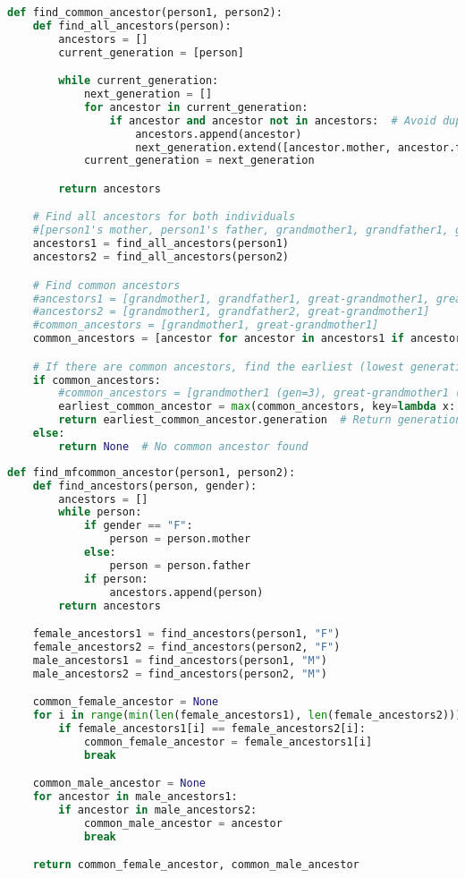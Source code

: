 \begin{lstlisting}[language=Python]
def find_common_ancestor(person1, person2):
    def find_all_ancestors(person):
        ancestors = []
        current_generation = [person]

        while current_generation:
            next_generation = []
            for ancestor in current_generation:
                if ancestor and ancestor not in ancestors:  # Avoid duplicates
                    ancestors.append(ancestor)
                    next_generation.extend([ancestor.mother, ancestor.father])
            current_generation = next_generation

        return ancestors

    # Find all ancestors for both individuals
    #[person1's mother, person1's father, grandmother1, grandfather1, great-grandmother1, great-grandfather1]
    ancestors1 = find_all_ancestors(person1)
    ancestors2 = find_all_ancestors(person2)

    # Find common ancestors
    #ancestors1 = [grandmother1, grandfather1, great-grandmother1, great-grandfather1]
    #ancestors2 = [grandmother1, grandfather2, great-grandmother1]
    #common_ancestors = [grandmother1, great-grandmother1]
    common_ancestors = [ancestor for ancestor in ancestors1 if ancestor in ancestors2]

    # If there are common ancestors, find the earliest (lowest generation number)
    if common_ancestors:
        #common_ancestors = [grandmother1 (gen=3), great-grandmother1 (gen=2)] => answer should be 3
        earliest_common_ancestor = max(common_ancestors, key=lambda x: x.generation)
        return earliest_common_ancestor.generation  # Return generation of the earliest common ancestor
    else:
        return None  # No common ancestor found

\end{lstlisting}
\begin{lstlisting}[language=Python]
def find_mfcommon_ancestor(person1, person2):
    def find_ancestors(person, gender):
        ancestors = []
        while person:
            if gender == "F":
                person = person.mother
            else:
                person = person.father
            if person:
                ancestors.append(person)
        return ancestors

    female_ancestors1 = find_ancestors(person1, "F")
    female_ancestors2 = find_ancestors(person2, "F")
    male_ancestors1 = find_ancestors(person1, "M")
    male_ancestors2 = find_ancestors(person2, "M")

    common_female_ancestor = None
    for i in range(min(len(female_ancestors1), len(female_ancestors2))):
        if female_ancestors1[i] == female_ancestors2[i]:
            common_female_ancestor = female_ancestors1[i]
            break

    common_male_ancestor = None
    for ancestor in male_ancestors1:
        if ancestor in male_ancestors2:
            common_male_ancestor = ancestor
            break

    return common_female_ancestor, common_male_ancestor
\end{lstlisting}
